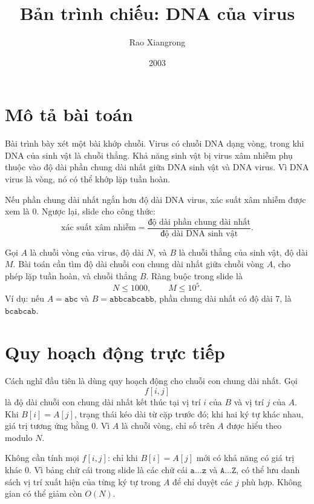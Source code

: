 \documentclass[11pt]{article}
\title{Bản trình chiếu: DNA của virus}
\author{Rao Xiangrong}
\date{2003}
\begin{document}
\maketitle


\section{Mô tả bài toán}

Bài trình bày xét một bài khớp chuỗi. Virus có chuỗi DNA dạng vòng, trong khi
DNA của sinh vật là chuỗi thẳng. Khả năng sinh vật bị virus xâm nhiễm phụ
thuộc vào độ dài phần chung dài nhất giữa DNA sinh vật và DNA virus. Vì DNA
virus là vòng, nó có thể khớp lặp tuần hoàn.

Nếu phần chung dài nhất ngắn hơn độ dài DNA virus, xác suất xâm nhiễm được
xem là \(0\). Ngược lại, slide cho công thức:
\[
  \text{xác suất xâm nhiễm}
  =
  \frac{\text{độ dài phần chung dài nhất}}{\text{độ dài DNA sinh vật}}.
\]

Gọi \(A\) là chuỗi vòng của virus, độ dài \(N\), và \(B\) là chuỗi thẳng của
sinh vật, độ dài \(M\). Bài toán cần tìm độ dài chuỗi con chung dài nhất giữa
chuỗi vòng \(A\), cho phép lặp tuần hoàn, và chuỗi thẳng \(B\). Ràng buộc
trong slide là
\[
  N\le 1000,\qquad M\le 10^5.
\]
Ví dụ: nếu \(A=\texttt{abc}\) và \(B=\texttt{abbcabcabb}\), phần chung dài
nhất có độ dài \(7\), là \(\texttt{bcabcab}\).

\section{Quy hoạch động trực tiếp}

Cách nghĩ đầu tiên là dùng quy hoạch động cho chuỗi con chung dài nhất. Gọi
\[
  f[i,j]
\]
là độ dài chuỗi con chung dài nhất kết thúc tại vị trí \(i\) của \(B\) và vị
trí \(j\) của \(A\). Khi \(B[i]=A[j]\), trạng thái kéo dài từ cặp trước đó;
khi hai ký tự khác nhau, giá trị tương ứng bằng \(0\). Vì \(A\) là chuỗi
vòng, chỉ số trên \(A\) được hiểu theo modulo \(N\).

Không cần tính mọi \(f[i,j]\): chỉ khi \(B[i]=A[j]\) mới có khả năng có giá
trị khác \(0\). Vì bảng chữ cái trong slide là các chữ cái
\(\texttt{a}\ldots\texttt{z}\) và \(\texttt{A}\ldots\texttt{Z}\), có thể lưu
danh sách vị trí xuất hiện của từng ký tự trong \(A\) để chỉ duyệt các \(j\)
phù hợp. Không gian có thể giảm còn \(O(N)\).
\end{document}
